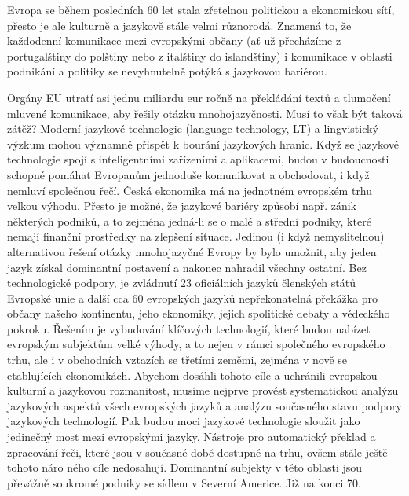 \begin{multicols}{2}
    
Evropa se během posledních 60 let stala zřetelnou politickou a ekonomickou sítí, přesto je ale kulturně a jazykově stále velmi různorodá. Znamená to, že každodenní komunikace mezi evropskými občany (ať už přecházíme z portugalštiny do polštiny nebo z italštiny do islandštiny) i komunikace v oblasti podnikání a politiky se nevyhnutelně potýká s jazykovou bariérou.


Orgány EU utratí asi jednu miliardu eur ročně na překládání textů a tlumočení mluvené komunikace, aby řešily otázku mnohojazyčnosti. Musí to však být taková zátěž? Moderní jazykové technologie (language technology, LT) a lingvistický výzkum mohou významně přispět k bourání jazykových hranic. Když se jazykové technologie spojí s inteligentními zařízeními a aplikacemi, budou v budoucnosti schopné pomáhat Evropanům jednoduše komunikovat a obchodovat, i když nemluví společnou řečí.
Česká ekonomika má na jednotném evropském trhu velkou výhodu. Přesto je možné, že jazykové bariéry způsobí např. zánik některých podniků, a to zejména jedná-li se o malé a střední podniky, které nemají finanční prostředky na zlepšení situace. Jedinou (i když nemyslitelnou) alternativou řešení otázky mnohojazyčné Evropy by bylo umožnit, aby jeden jazyk získal dominantní postavení a nakonec nahradil všechny ostatní.
Bez technologické podpory, je zvládnutí 23 oficiálních jazyků členských států Evropské unie a další cca 60 evropských jazyků nepřekonatelná překážka pro občany našeho kontinentu, jeho ekonomiky, jejich spolitické debaty a vědeckého pokroku.
Řešením je vybudování klíčových technologií, které budou nabízet evropským subjektům velké výhody, a to nejen v rámci společného evropského trhu, ale i v obchodních vztazích se třetími zeměmi, zejména v nově se etablujících ekonomikách. Abychom dosáhli tohoto cíle a uchránili evropskou kulturní a jazykovou rozmanitost, musíme nejprve provést systematickou analýzu jazykových aspektů všech evropských jazyků a analýzu současného stavu podpory jazykových technologií. Pak budou moci jazykové technologie sloužit jako jedinečný most mezi evropskými jazyky. Nástroje pro automatický překlad a zpracování řeči, které jsou v současné době dostupné na trhu, ovšem stále ještě tohoto náro ného cíle nedosahují. Dominantní subjekty v této oblasti jsou převážně soukromé podniky se sídlem v Severní Americe. Již na konci 70. 


\end{multicols}
